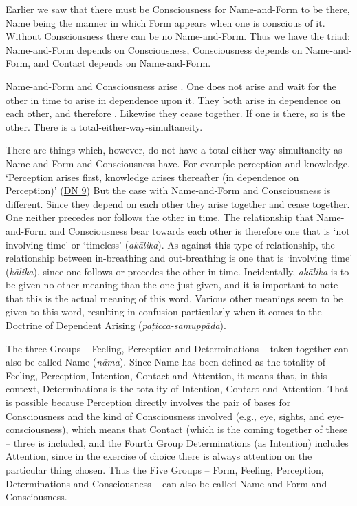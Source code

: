 Earlier we saw that there must be Consciousness for Name-and-Form to be there, Name being the manner in which Form appears when one is conscious of it. Without Consciousness there can be no Name-and-Form. Thus we have the triad: Name-and-Form depends on Consciousness, Consciousness depends on Name-and-Form, and Contact depends on Name-and-Form.

Name-and-Form and Consciousness arise . One does not arise and wait for the other in time to arise in dependence upon it. They both arise in dependence on each other, and therefore . Likewise they cease together. If one is there, so is the other. There is a total-either-way-simultaneity.

There are things which, however, do not have a total-either-way-simultaneity as Name-and-Form and Consciousness have. For example perception and knowledge. `Perception arises first, knowledge arises thereafter (in dependence on Perception)' (\href{https://suttacentral.net/dn9/en/thanissaro}{DN 9}) But the case with Name-and-Form and Consciousness is different. Since they depend on each other they arise together and cease together. One neither precedes nor follows the other in time. The relationship that Name-and-Form and Consciousness bear towards each other is therefore one that is `not involving time' or `timeless' (\emph{akālika}). As against this type of relationship, the relationship between in-breathing and out-breathing is one that is `involving time' (\emph{kālika}), since one follows or precedes the other in time. Incidentally, \emph{akālika} is to be given no other meaning than the one just given, and it is important to note that this is the actual meaning of this word. Various other meanings seem to be given to this word, resulting in confusion particularly when it comes to the Doctrine of Dependent Arising (\emph{paṭicca-samuppāda}).

The three Groups -- Feeling, Perception and Determinations -- taken together can also be called Name (\emph{nāma}). Since Name has been defined as the totality of Feeling, Perception, Intention, Contact and Attention, it means that, in this context, Determinations is the totality of Intention, Contact and Attention. That is possible because Perception directly involves the pair of bases for Consciousness and the kind of Consciousness involved (e.g., eye, sights, and eye-consciousness), which means that Contact (which is the coming together of these -- three is included, and the Fourth Group Determinations (as Intention) includes Attention, since in the exercise of choice there is always attention on the particular thing chosen. Thus the Five Groups -- Form, Feeling, Perception, Determinations and Consciousness -- can also be called Name-and-Form and Consciousness.
